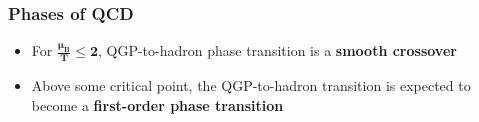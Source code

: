 \begin{frame}
  \frametitle{\textbf{Phases of QCD}}
  \begin{itemize}
  \item For $\mathbf{\frac{\mu_B}{T} \leq 2}$, QGP-to-hadron phase transition is a \textbf{smooth crossover}
  \item Above some critical point, the QGP-to-hadron transition is expected to become a \textbf{first-order phase transition}
  \end{itemize}

  \

  \centering
\end{frame}
